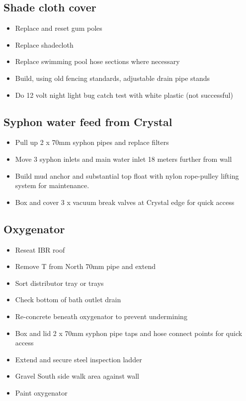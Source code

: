 \subsection{Shade cloth cover}  
\begin{itemize}
\item Replace and reset gum poles  \checkmark
\item Replace shadecloth \checkmark 
\item Replace swimming pool hose sections where necessary \checkmark
\item Build, using old fencing standards, adjustable drain pipe stands
\item Do 12 volt night light bug catch test with white plastic \checkmark (not successful)
\end{itemize}


\subsection{Syphon water feed from Crystal}
\begin{itemize}
\item  Pull up 2 x 70mm syphon pipes and replace filters \checkmark
\item Move 3 syphon inlets and main water inlet 18 meters further from wall
\item Build mud anchor and substantial top float with nylon rope-pulley lifting system for maintenance.
\item Box and cover 3 x vacuum break valves at Crystal edge for quick access
\end{itemize}


\subsection{Oxygenator}
\begin{itemize}
\item Reseat IBR roof \checkmark
\item Remove T from North 70mm pipe and extend  \checkmark
\item Sort distributor tray or trays \checkmark
\item Check bottom of bath outlet drain \checkmark
\item Re-concrete beneath oxygenator to prevent undermining \checkmark
\item Box and lid 2 x 70mm syphon pipe taps and hose connect points for quick access 
\item Extend and secure steel inspection ladder
\item Gravel South side walk area against wall 
\item Paint oxygenator
\end{itemize}



